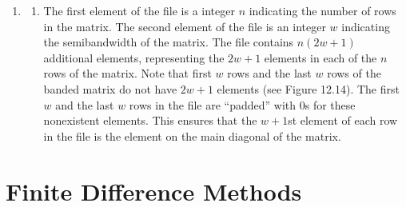 \begin{enumerate}
Next we consider the computation time.
As the algorithm progresses, we manipulate elements in fewer and fewer
columns. Hence processes gradually drop out of the computation.
The processes associated with the rightmost columns stay active until the end.
They determine the computation time of the program.
Each process is responsible for $n^2/p$ elements. If the process manipulates
all of these elements for all $n$ iterations, the time complexity
of these computations is $\Theta(n^3/p)$.

Now we can determine the isoefficiency of the algorithm.
The total communication overhead across $p$ processes is
$\Theta(n^2p\log{p}/\sqrt{p}) = \Theta(n^2\log p\sqrt{p})$.
Hence
$$n^3 = Cn^2\sqrt{p}\log{p}) \Rightarrow n = C\sqrt{p}\log{p}$$
For this algorithm $M(n) = n^2$.
Hence the scalability function is
$$M(C\sqrt{p}\log p)/p = C^2p\log^2p/p = C^2\log^2p$$

This algorithm is much more scalable than the row-oriented and
column-oriented algorithms developed in the chapter.
It is not as scalable as the pipelined, row-oriented algorithm.

\addtocounter{enumi}{1}
\addtocounter{enumi}{1}
\item
\begin{enumerate}
\item
The first element of the file is a integer $n$ indicating the number of
rows in the matrix.
The second element of the file is an integer $w$ indicating the semibandwidth
of the matrix.
The file contains $n(2w+1)$ additional elements, representing the $2w+1$
elements in each of the $n$ rows of the matrix.
Note that first $w$ rows and the last $w$ rows of the banded matrix do not have
$2w+1$ elements (see Figure 12.14).
The first $w$ and the last $w$ rows in the file are ``padded'' with 0s for these
nonexistent elements. 
This ensures that the $w+1$st element of each row in the file
is the element on the
main diagonal of the matrix.
\end{enumerate}

\end{enumerate}

\chapter{Finite Difference Methods}

